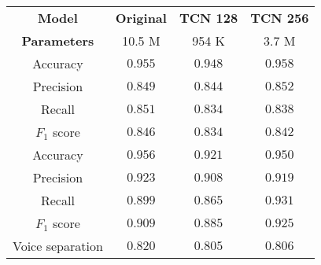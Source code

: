 \begin{tabular}{c|ccc}
    \textbf{Model}      & \textbf{Original} & \textbf{TCN 128} & \textbf{TCN 256} \\
    \textbf{Parameters} & 10.5 M            & 954 K            & 3.7 M            \\\hline
    Accuracy            & $0.955$           & $0.948$          & $\mathbf{0.958}$ \\
    Precision           & $0.849$           & $0.844$          & $\mathbf{0.852}$ \\
    Recall              & $\mathbf{0.851}$  & $0.834$          & $0.838$          \\
    $F_1$ score         & $\mathbf{0.846}$  & $0.834$          & $0.842$          \\\hline
    Accuracy            & $\mathbf{0.956}$  & $0.921$          & $0.950$          \\
    Precision           & $0.923$           & $\mathbf{0.908}$ & $0.919$          \\
    Recall              & $0.899$           & $0.865$          & $\mathbf{0.931}$ \\
    $F_1$ score         & $0.909$           & $0.885$          & $\mathbf{0.925}$ \\\hline
    Voice separation    & $\mathbf{0.820}$  & $0.805$          & $0.806$          \\
\end{tabular}